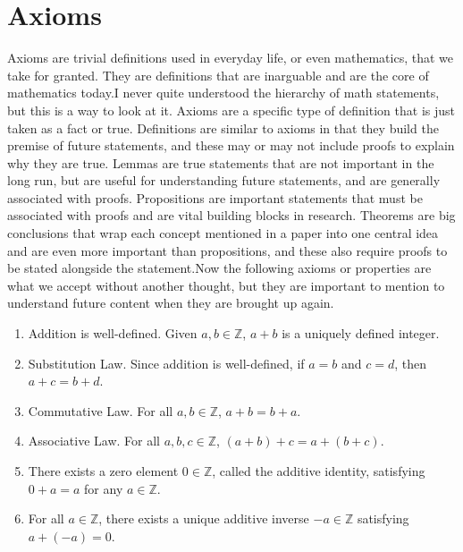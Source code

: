 
\section{Axioms}

Axioms are trivial definitions used in everyday life, or even mathematics, that we take for granted.
They are definitions that are inarguable and are the core of mathematics today.I never quite understood the hierarchy of math statements, but this is a way to look at it.
Axioms are a specific type of definition that is just taken as a fact or true.
Definitions are similar to axioms in that they build the premise of future statements, and these may or may not include proofs to explain why they are true.
Lemmas are true statements that are not important in the long run, but are useful for understanding future statements, and are generally associated with proofs.
Propositions are important statements that must be associated with proofs and are vital building blocks in research.
Theorems are big conclusions that wrap each concept mentioned in a paper into one central idea and are even more important than propositions, and these also require proofs to be stated alongside the statement.Now the following axioms or properties are what we accept without another thought, but they are important to mention to understand future content when they are brought up again.

\begin{definition}
    \begin{enumerate}
        \item Addition is well-defined.
        Given $a,b \in \mathbb{Z}$, $a + b$ is a uniquely defined integer.

        \item Substitution Law.
        Since addition is well-defined, if $a = b$ and $c = d$, then $a + c = b + d$.

        \item Commutative Law.
        For all $a,b \in \mathbb{Z}$, $a + b = b + a$.

        \item Associative Law.
        For all $a,b,c \in \mathbb{Z}$, $(a + b) + c = a + (b + c)$.

        \item There exists a zero element $0 \in \mathbb{Z}$, called the additive identity, satisfying $0 + a = a$ for any $a \in \mathbb{Z}$.

        \item For all $a \in \mathbb{Z}$, there exists a unique additive inverse $-a \in \mathbb{Z}$ satisfying $a + (-a) = 0$.
    \end{enumerate}
\end{definition}

